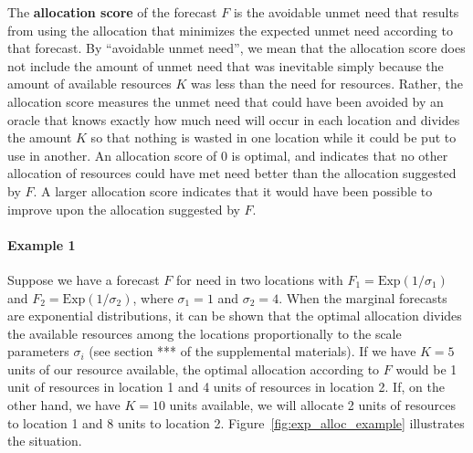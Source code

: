 \documentclass{article}\usepackage[]{graphicx}\usepackage[]{xcolor}
\begin{document}
The \textbf{allocation score} of the forecast $F$ is the avoidable unmet need that results from using the allocation that minimizes the expected unmet need according to that forecast.
By ``avoidable unmet need'', we mean that the allocation score does not include the amount of unmet need that was inevitable simply because the amount of available resources $K$ was less than the need for resources.
Rather, the allocation score measures the unmet need that could have been avoided by an oracle that knows exactly how much need will occur in each location and divides the amount $K$ so that nothing is wasted in one location while it could be put to use in another. An allocation score of 0 is optimal, and indicates that no other allocation of resources could have met need better than the allocation suggested by $F$. A larger allocation score indicates that it would have been possible to improve upon the allocation suggested by $F$.

\paragraph{Example 1} Suppose we have a forecast $F$ for need in two locations with $F_1 = \mathrm{Exp}(1 / \sigma_1)$ and $F_2 = \mathrm{Exp}(1 / \sigma_2)$, where $\sigma_1 = 1$ and $\sigma_2 = 4$. When the marginal forecasts are exponential distributions, it can be shown that the optimal allocation divides the available resources among the locations proportionally to the scale parameters $\sigma_i$ (see section *** of the supplemental materials). If we have $K = 5$ units of our resource available, the optimal allocation according to $F$ would be 1 unit of resources in location 1 and 4 units of resources in location 2. If, on the other hand, we have $K = 10$ units available, we will allocate 2 units of resources to location 1 and 8 units to location 2. Figure~\ref{fig:exp_alloc_example} illustrates the situation.
\end{document}
